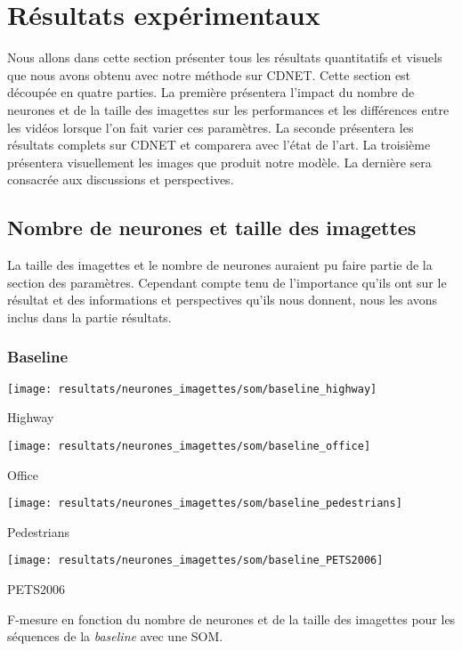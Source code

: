 	\newpage

	\section{Résultats expérimentaux}

	Nous allons dans cette section présenter tous les résultats quantitatifs et visuels que nous avons obtenu avec notre méthode sur CDNET. Cette section est découpée en quatre parties. La première présentera l'impact du nombre de neurones et de la taille des imagettes sur les performances et les différences entre les vidéos lorsque l'on fait varier ces paramètres. La seconde présentera les résultats complets sur CDNET et comparera avec l'état de l'art. La troisième présentera visuellement les images que produit notre modèle. La dernière sera consacrée aux discussions et perspectives.

	\subsection{Nombre de neurones et taille des imagettes}

	La taille des imagettes et le nombre de neurones auraient pu faire partie de la section des paramètres. Cependant compte tenu de l'importance qu'ils ont sur le résultat et des informations et perspectives qu'ils nous donnent, nous les avons inclus dans la partie résultats.

	\subsubsection{Baseline}

	\begin{figureth}
		\begin{subfigureth}{.49\textwidth}
			\texttt{[image: resultats/neurones\_imagettes/som/baseline\_highway]}\caption{Highway}
		\end{subfigureth}
		\begin{subfigureth}{.49\textwidth}
			\texttt{[image: resultats/neurones\_imagettes/som/baseline\_office]}\caption{Office}
		\end{subfigureth}
		\begin{subfigureth}{.49\textwidth}
			\texttt{[image: resultats/neurones\_imagettes/som/baseline\_pedestrians]}\caption{Pedestrians}
		\end{subfigureth}
		\begin{subfigureth}{.49\textwidth}
			\texttt{[image: resultats/neurones\_imagettes/som/baseline\_PETS2006]}\caption{PETS2006}
		\end{subfigureth}
		\caption[F-mesure en fonction du nombre de neurones et de la taille des imagettes, SOM baseline]{F-mesure en fonction du nombre de neurones et de la taille des imagettes pour les séquences de la \textit{baseline} avec une SOM.}\label{fig:res:F-mesure3D-baselineSOM}
	\end{figureth}

